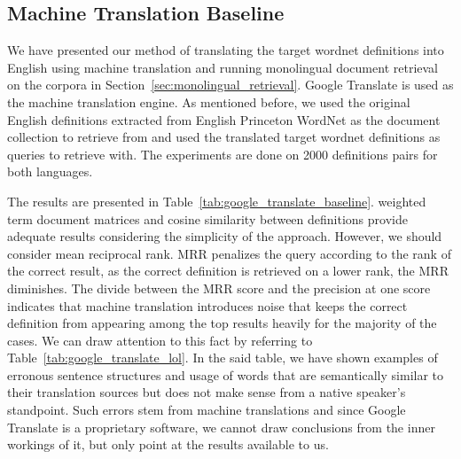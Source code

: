 
\subsection{Machine Translation Baseline}%
\label{sub:chap4_results}

We have presented our method of translating the target wordnet definitions into English using machine translation and running monolingual document retrieval on the corpora in Section~\ref{sec:monolingual_retrieval}.
Google Translate is used as the machine translation engine.
As mentioned before, we used the original English definitions extracted from English Princeton WordNet as the document collection to retrieve from and used the translated target wordnet definitions as queries to retrieve with.
The experiments are done on 2000 definitions pairs for both languages.

The results are presented in Table~\ref{tab:google_translate_baseline}.
\tfidf{} weighted term document matrices and cosine similarity between definitions provide adequate results considering the simplicity of the approach.
However, we should consider mean reciprocal rank.
MRR penalizes the query according to the rank of the correct result, as the correct definition is retrieved on a lower rank, the MRR diminishes.
The divide between the MRR score and the precision at one score indicates that machine translation introduces noise that keeps the correct definition from appearing among the top results heavily for the majority of the cases.
We can draw attention to this fact by referring to Table~\ref{tab:google_translate_lol}.
In the said table, we have shown examples of erronous sentence structures and usage of words that are semantically similar to their translation sources but does not make sense from a native speaker's standpoint.
Such errors stem from machine translations and since Google Translate is a proprietary software, we cannot draw conclusions from the inner workings of it, but only point at the results available to us.

